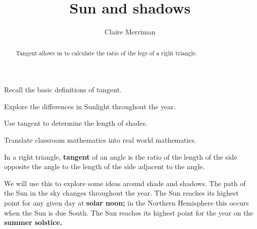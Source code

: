 \documentclass[noauthor,nooutcomes,handout,hints,12pt]{ximera}
\author{Claire Merriman}
\title{Sun and shadows}
\begin{document}
\begin{abstract}
Tangent allows us to calculate the ratio of the legs of a right triangle.
\end{abstract}
\maketitle

\begin{listOutcomes}
\item  Recall the basic definitions of tangent.
\item Explore the differences in Sunlight throughout the year.
\item Use tangent to determine the length of shades.
\item Translate classroom mathematics into real world mathematics.
\end{listOutcomes}


\begin{definition}
 In a right triangle, \textbf{tangent} of an angle is the ratio of the length of the side opposite the angle to the length of the side adjacent to the angle. 
\end{definition}
We will use this to explore some ideas around shade and shadows.  The
path of the Sun in the sky changes throughout the year. The Sun
reaches its highest point for any given day at \textbf{solar noon;} in
the Northern Hemisphere this occurs when the Sun is due South. The Sun
reaches its highest point for the year on the \textbf{summer solstice.}

\begin{center}
 
\end{center}
\end{document}
